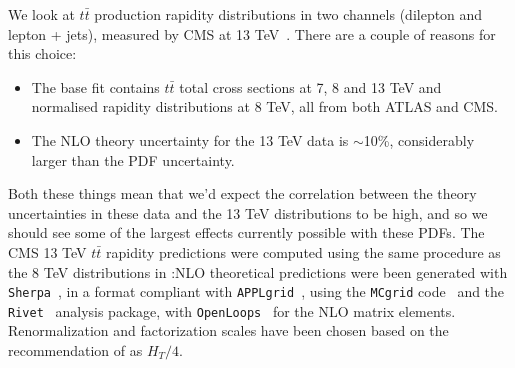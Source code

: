 We look at $t\bar{t}$ production rapidity distributions in two channels (dilepton and lepton + jets), measured by CMS at 13 TeV~\cite{Sirunyan:2018ucr,Sirunyan:2018wem}. There are a couple of reasons for this choice:
\begin{itemize}
\item The base fit contains $t\bar{t}$ total cross sections at 7, 8 and 13 TeV and normalised rapidity distributions at 8 TeV, all from both ATLAS and CMS.
\item The NLO theory uncertainty for the 13 TeV data is $\sim$10\%, considerably larger than the PDF uncertainty.
\end{itemize}
Both these things mean that we'd expect the correlation between the theory uncertainties in these data and the 13 TeV distributions to be high, and so we should see some of the largest effects currently possible with these PDFs. The CMS 13 TeV $t\bar{t}$ rapidity predictions were computed using the same procedure as the 8 TeV distributions in \cite{Ball:2017nwa}:NLO theoretical predictions were been generated with {\tt Sherpa}~\cite{Gleisberg:2008ta}, in a format compliant with {\tt APPLgrid}~\cite{Carli:2010rw}, using the {\tt MCgrid} 
code~\cite{DelDebbio:2013kxa} and the {\tt Rivet}~\cite{Buckley:2010ar} analysis package, with {\tt OpenLoops}~\cite{Cascioli:2011va} for the NLO 
matrix elements. Renormalization and factorization scales have been chosen based on the recommendation of \cite{Czakon:2016dgf} as $H_T/4$.

